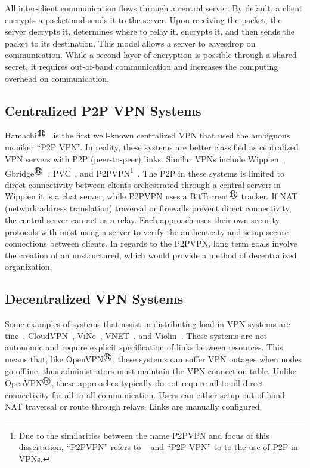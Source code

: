 All inter-client communication flows through a central server.  By default, a
client encrypts a packet and sends it to the server.  Upon receiving the
packet, the server decrypts it, determines where to relay it, encrypts it, and
then sends the packet to its destination.  This model allows a server to
eavesdrop on communication.  While a second layer of encryption is possible
through a shared secret, it requires out-of-band communication and increases
the computing overhead on communication.


\subsection{Centralized P2P VPN Systems}

Hamachi$^\registered$~\cite{hamachi} is the first well-known centralized VPN that used the
ambiguous moniker ``P2P VPN''.  In reality, these systems are better classified
as centralized VPN servers with P2P (peer-to-peer) links.  Similar VPNs include
Wippien~\cite{wippien}, Gbridge$^\registered$~\cite{gbridge}, PVC~\cite{pvc}, and
P2PVPN\footnote{Due to the similarities between the name P2PVPN and focus of
this dissertation, ``P2PVPN'' refers to ~\cite{p2pvpn} and ``P2P VPN'' to to
the use of P2P in VPNs.}~\cite{p2pvpn}.  The P2P in these systems is limited to
direct connectivity between clients orchestrated through a central server: in
Wippien it is a chat server, while P2PVPN uses a BitTorrent$^\registered$ tracker.  If NAT
(network address translation) traversal or firewalls prevent direct
connectivity, the central server can act as a relay.  Each approach uses their
own security protocols with most using a server to verify the authenticity and
setup secure connections between clients.  In regards to the P2PVPN, long term
goals involve the creation of an unstructured, which would provide a method of
decentralized organization.

\subsection{Decentralized VPN Systems}
Some examples of systems that assist in distributing load in VPN systems are
tinc~\cite{tinc}, CloudVPN~\cite{cloudvpn}, ViNe~\cite{vine}, VNET~\cite{vnet},
and Violin~\cite{violin}.  These systems are not autonomic and require explicit
specification of links between resources.  This means that, like OpenVPN$^\registered$, these
systems can suffer VPN outages when nodes go offline, thus administrators must
maintain the VPN connection table.  Unlike OpenVPN$^\registered$, these approaches typically
do not require all-to-all direct connectivity for all-to-all communication.
Users can either setup out-of-band NAT traversal or route through relays.  Links
are manually configured.

